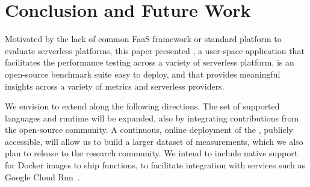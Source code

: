 
\section{Conclusion and Future Work}\label{sec:conclusion}

Motivated by the lack of common FaaS framework or standard platform to evaluate serverless platforms, this paper presented \sys, a user-space application that facilitates the performance testing across a variety of serverless platform.
\sys is an open-source benchmark suite easy to deploy, and that provides meaningful insights across a variety of metrics and serverless providers. 

We envision to extend \sys along the following directions.
The set of supported languages and runtime will be expanded, also by integrating contributions from the open-source community.
A continuous, online deployment of the \sys, publicly accessible, will allow us to build a larger dataset of measurements, which we also plan to release to the research community.
We intend to include native support for Docker images to ship functions, to facilitate integration with services such as Google Cloud Run~\cite{cloudrun}.


